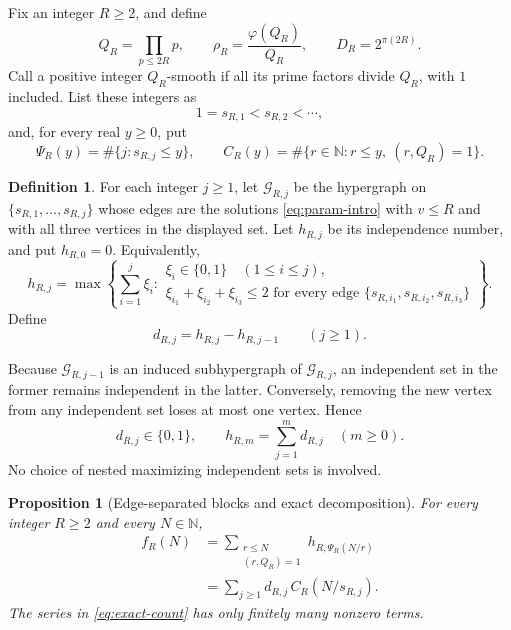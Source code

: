 \documentclass[11pt]{article}
\newtheorem{proposition}[theorem]{Proposition}
\theoremstyle{definition}
\newtheorem{definition}[theorem]{Definition}
\theoremstyle{remark}
\numberwithin{equation}{section}
\newcommand{\N}{\mathbb N}
\begin{document}
Fix an integer \(R\ge2\), and define
\begin{equation}\label{eq:Q}
 Q_R=\prod_{p\le2R}p,\qquad
 \rho_R=\frac{\varphi(Q_R)}{Q_R},\qquad
 D_R=2^{\pi(2R)}.
\end{equation}
Call a positive integer \(Q_R\)-smooth if all its prime factors
divide \(Q_R\), with \(1\) included. List these integers as
\[
 1=s_{R,1}<s_{R,2}<\cdots,
\]
and, for every real \(y\ge0\), put
\[
 \Psi_R(y)=\#\{j:s_{R,j}\le y\},\qquad
 C_R(y)=\#\{r\in\N:r\le y,\ (r,Q_R)=1\}.
\]

\begin{definition}\label{def:finite-variational}
For each integer \(j\ge1\), let \(\mathcal G_{R,j}\) be the
hypergraph on
\(\{s_{R,1},\ldots,s_{R,j}\}\) whose edges are the solutions
\eqref{eq:param-intro} with \(v\le R\) and with all three vertices
in the displayed set. Let \(h_{R,j}\) be its
independence number, and put \(h_{R,0}=0\). Equivalently,
\begin{equation}\label{eq:finite-max}
 h_{R,j}=
 \max\left\{
 \sum_{i=1}^j\xi_i:
 \begin{array}{l}
 \xi_i\in\{0,1\}\quad(1\le i\le j),\\
 \xi_{i_1}+\xi_{i_2}+\xi_{i_3}\le2
 \text{ for every edge }
 \{s_{R,i_1},s_{R,i_2},s_{R,i_3}\}
 \end{array}
 \right\}.
\end{equation}
Define
\[
 d_{R,j}=h_{R,j}-h_{R,j-1}\qquad(j\ge1).
\]
\end{definition}

Because \(\mathcal G_{R,j-1}\) is an induced subhypergraph of
\(\mathcal G_{R,j}\), an independent set in the former remains
independent in the latter. Conversely, removing the new vertex
from any independent set loses at most one vertex. Hence
\begin{equation}\label{eq:increments}
 d_{R,j}\in\{0,1\},\qquad
 h_{R,m}=\sum_{j=1}^m d_{R,j}\quad(m\ge0).
\end{equation}
No choice of nested maximizing independent sets is involved.

\begin{proposition}[Edge-separated blocks and exact decomposition]
\label{prop:blocks}
For every integer \(R\ge2\) and every \(N\in\N\),
\begin{align}
 f_R(N)
 &=\sum_{\substack{r\le N\\(r,Q_R)=1}}
       h_{R,\Psi_R(N/r)}
 \label{eq:block-sum}\\
 &=\sum_{j\ge1}d_{R,j}\,C_R(N/s_{R,j}).
 \label{eq:exact-count}
\end{align}
The series in \eqref{eq:exact-count} has only finitely many
nonzero terms.
\end{proposition}
\end{document}
